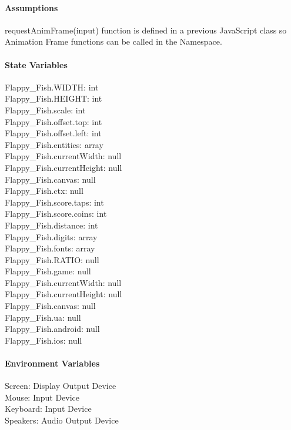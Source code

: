 \documentclass[11pt, oneside]{article}   	%
\begin{document}
\paragraph{Assumptions}
requestAnimFrame(input) function is defined in a previous JavaScript class so Animation Frame functions can be called in the Namespace.
\paragraph{State Variables}
Flappy\_Fish.WIDTH: int \\
Flappy\_Fish.HEIGHT: int \\
Flappy\_Fish.scale: int \\
Flappy\_Fish.offset.top: int \\
Flappy\_Fish.offset.left: int \\ 
Flappy\_Fish.entities: array \\
Flappy\_Fish.currentWidth: null \\
Flappy\_Fish.currentHeight: null \\
Flappy\_Fish.canvas: null \\ 
Flappy\_Fish.ctx: null \\
Flappy\_Fish.score.taps: int \\
Flappy\_Fish.score.coins: int \\
Flappy\_Fish.distance: int \\
Flappy\_Fish.digits: array \\
Flappy\_Fish.fonts: array \\ 
Flappy\_Fish.RATIO: null \\
Flappy\_Fish.game: null \\
Flappy\_Fish.currentWidth: null \\
Flappy\_Fish.currentHeight: null \\
Flappy\_Fish.canvas: null \\
Flappy\_Fish.ua: null \\
Flappy\_Fish.android: null \\
Flappy\_Fish.ios: null \\

\paragraph{Environment Variables}
Screen: Display Output Device \\
Mouse: Input Device \\
Keyboard: Input Device \\
Speakers: Audio Output Device 
\end{document}
